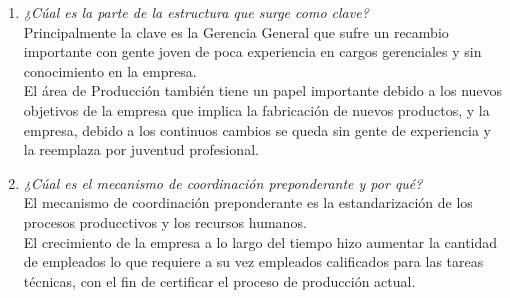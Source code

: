 \documentclass[a4paper,10pt]{article}
\begin{document}
\begin{enumerate}
			\item \textit{¿Cúal es la parte de la estructura que surge como clave?}\\
			Principalmente la clave es la Gerencia General que sufre un recambio importante con gente joven de poca experiencia en cargos gerenciales y sin conocimiento en la empresa.\\
El área de Producción también tiene un papel importante debido a los nuevos objetivos de la empresa que implica la fabricación de nuevos productos, y la empresa, debido a los continuos cambios se queda sin gente de experiencia y la reemplaza por juventud profesional.\\

			
			\item \textit{¿Cúal es el mecanismo de coordinación preponderante y por qué?}\\
			El mecanismo de coordinación preponderante es la estandarización de los procesos producctivos y los recursos humanos.\\ El crecimiento de la empresa a lo largo del tiempo hizo aumentar la cantidad de empleados lo que requiere a su vez empleados calificados para las tareas técnicas, con el fin de certificar el proceso de producción actual. 
						

\end{enumerate}
\end{document}
